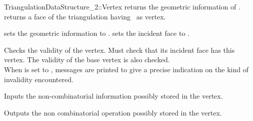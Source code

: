\begin{ccRefConcept}{TriangulationDataStructure_2::Vertex}
{returns  the geometric information of \ccVar.}
\ccGlue
{}
{returns a face of the triangulation having  \ccVar\ as vertex.}

\begin{ccAdvanced}

{sets the geometric information to .}
\ccGlue
{}
{sets the incident face to .}

\end{ccAdvanced}


{Checks the validity of the vertex. Must check that its incident face
has this vertex. The validity of the base vertex is also checked.\\
When  is set to , messages are printed to give
a precise indication on the kind of invalidity encountered.}



{Inputs the non-combinatorial information possibly stored in the vertex.} 

{Outputs the non combinatorial operation possibly stored in the
vertex.}



\ccHasModels
{}


\ccSeeAlso
{} \\
 \\

\end{ccRefConcept}


